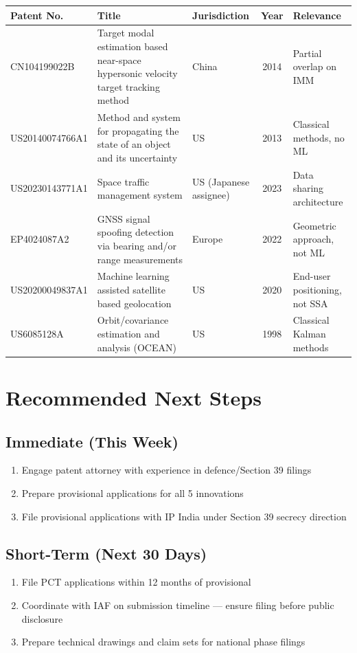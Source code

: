 \documentclass[11pt,a4paper]{article}
\begin{document}
\renewcommand{\arraystretch}{1.3}
\begin{tabularx}{\textwidth}{l Y l c l}
\toprule
\textbf{Patent No.} & \textbf{Title} & \textbf{Jurisdiction} & \textbf{Year} & \textbf{Relevance} \\
\midrule
CN104199022B & Target modal estimation based near-space hypersonic velocity target tracking method & China & 2014 & Partial overlap on IMM \\
US20140074766A1 & Method and system for propagating the state of an object and its uncertainty & US & 2013 & Classical methods, no ML \\
US20230143771A1 & Space traffic management system & US (Japanese assignee) & 2023 & Data sharing architecture \\
EP4024087A2 & GNSS signal spoofing detection via bearing and/or range measurements & Europe & 2022 & Geometric approach, not ML \\
US20200049837A1 & Machine learning assisted satellite based geolocation & US & 2020 & End-user positioning, not SSA \\
US6085128A & Orbit/covariance estimation and analysis (OCEAN) & US & 1998 & Classical Kalman methods \\
\bottomrule
\end{tabularx}

\newpage

\section{Recommended Next Steps}

\subsection{Immediate (This Week)}
\begin{enumerate}
\item Engage patent attorney with experience in defence/Section 39 filings
\item Prepare provisional applications for all 5 innovations
\item File provisional applications with IP India under Section 39 secrecy direction
\end{enumerate}

\subsection{Short-Term (Next 30 Days)}
\begin{enumerate}
\item File PCT applications within 12 months of provisional
\item Coordinate with IAF on submission timeline — ensure filing before public disclosure
\item Prepare technical drawings and claim sets for national phase filings
\end{enumerate}
\end{document}
